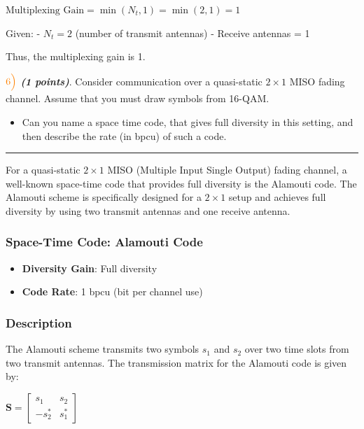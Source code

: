 \documentclass[11pt]{article}
\providecommand{\tightlist}{%
      \setlength{\itemsep}{0pt}\setlength{\parskip}{0pt}}
\begin{document}
\(\text{Multiplexing Gain} = \min(N_t, 1) = \min(2, 1) = 1\)

Given: - \(N_t = 2\) (number of transmit antennas) - Receive antennas =
1

Thus, the multiplexing gain is 1.

    \(\color{orange}6\Bigl)\) \textbf{\emph{(1 points)}}. Consider
communication over a quasi-static \(2 \times 1\) MISO fading channel.
Assume that you must draw symbols from 16-QAM.

\begin{itemize}
\tightlist
\item
  Can you name a space time code, that gives full diversity in this
  setting, and then describe the rate (in bpcu) of such a code.
\end{itemize}

    \begin{center}\rule{0.5\linewidth}{0.5pt}\end{center}

For a quasi-static \(2 \times 1\) MISO (Multiple Input Single Output)
fading channel, a well-known space-time code that provides full
diversity is the Alamouti code. The Alamouti scheme is specifically
designed for a \(2 \times 1\) setup and achieves full diversity by using
two transmit antennas and one receive antenna.

\subsubsection{Space-Time Code: Alamouti
Code}\label{space-time-code-alamouti-code}

\begin{itemize}
\tightlist
\item
  \textbf{Diversity Gain}: Full diversity
\item
  \textbf{Code Rate}: 1 bpcu (bit per channel use)
\end{itemize}

\subsubsection{Description}\label{description}

The Alamouti scheme transmits two symbols \(s_1\) and \(s_2\) over two
time slots from two transmit antennas. The transmission matrix for the
Alamouti code is given by:

\(\mathbf{S} = \begin{bmatrix} s_1 & s_2 \\ -s_2^* & s_1^* \end{bmatrix}\)
\end{document}
